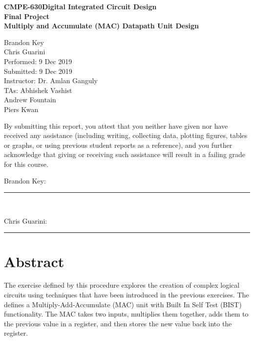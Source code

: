 \documentclass[11pt]{article}
\newcommand{\ClassNameS}{CMPE-630}
\newcommand{\ClassNameL}{Digital Integrated Circuit Design}
\newcommand{\ExerciseName}{Final Project}
\newcommand{\SubTitle}{Multiply and Accumulate (MAC) Datapath Unit Design}
\newcommand{\DueDate}{9 Dec 2019}
\begin{document}
\thispagestyle{empty}

%
%

\vspace*{2 cm}

\begin{center}
\bf{\ClassNameS \space \ClassNameL\\
    \ExerciseName\\
\vspace{0.25 cm}
\SubTitle
}
\end{center}

\vspace{4 cm}

\begin{flushright}
Brandon Key\\
Chris Guarini\\
Performed: 9 Dec 2019\\
Submitted: \DueDate\\
\vspace{0.5 cm}
Instructor: Dr. Amlan Ganguly\\
TAs: Abhishek Vashist\\
Andrew Fountain\\
Piers Kwan\\
\vspace{0.5 cm}
\end{flushright}

\vspace{2 cm}
\indent By submitting this report, you attest that you neither have given nor have received any assistance (including writing, collecting data, plotting figures, tables or graphs, or using previous student reports as a reference), and you further acknowledge that giving or receiving such assistance will result in a failing grade for this course.

\vspace{1 cm}

Brandon Key:   \rule{13cm}{.1pt}\\
\vspace{1 cm}

Chris Guarini:   \rule{13cm}{.1pt}

\newpage
\tableofcontents
\newpage

\section{Abstract}

The exercise defined by this procedure explores the creation of complex logical circuits using techniques that have been introduced in the previous exercises. The defines a Multiply-Add-Accumulate (MAC) unit with Built In Self Test (BIST) functionality. The MAC takes two inputs, multiplies them together, adds them to the previous value in a register, and then stores the new value back into the register. 
\end{document}
